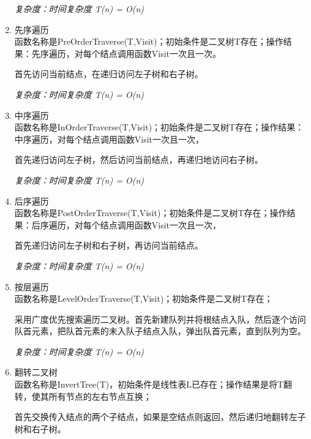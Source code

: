 \documentclass[supercite]{Experimental_Report}
\theoremstyle{definition}
\begin{document}
\begin{enumerate}
	\emph{复杂度：时间复杂度 T(n) = O(n)}
	\item 先序遍历\\
	函数名称是PreOrderTraverse(T,Visit)；初始条件是二叉树T存在；操作结果：先序遍历，对每个结点调用函数Visit一次且一次。
	
	首先访问当前结点，在递归访问左子树和右子树。
	
	\emph{复杂度：时间复杂度 T(n) = O(n)}
	\item 中序遍历\\
	函数名称是InOrderTraverse(T,Visit)；初始条件是二叉树T存在；操作结果：中序遍历，对每个结点调用函数Visit一次且一次，
	
	首先递归访问左子树，然后访问当前结点，再递归地访问右子树。
	
	\emph{复杂度：时间复杂度 T(n) = O(n)}
	\item 后序遍历\\
	函数名称是PostOrderTraverse(T,Visit)；初始条件是二叉树T存在；操作结果：后序遍历，对每个结点调用函数Visit一次且一次，
	
	首先递归访问左子树和右子树，再访问当前结点。
	
	\emph{复杂度：时间复杂度 T(n) = O(n)}
	\item 按层遍历\\
	函数名称是LevelOrderTraverse(T,Visit)；初始条件是二叉树T存在；
	
	采用广度优先搜索遍历二叉树。首先新建队列并将根结点入队，然后逐个访问队首元素，把队首元素的未入队子结点入队，弹出队首元素，直到队列为空。
	
	\emph{复杂度：时间复杂度 T(n) = O(n)}
	\item 翻转二叉树\\
	函数名称是InvertTree(T)，初始条件是线性表L已存在；操作结果是将T翻转，使其所有节点的左右节点互换；
	
	首先交换传入结点的两个子结点，如果是空结点则返回，然后递归地翻转左子树和右子树。
	

\end{enumerate}
\end{document}
